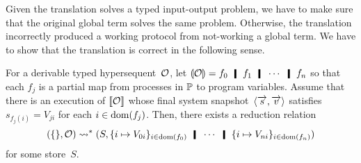  Given the translation solves a typed input-output problem, we have to
 make sure that the original global term solves the same problem.
 Otherwise, the translation incorrectly produced a working protocol from
 not-working a global term.
 We have to show that the translation is correct in the following sense.
  \begin{proposition}
   \label{general-sound}
   For a derivable typed hypersequent~$\mathcal{O}$, let $\semoi{\hypert} =
   f_0\hmid
   f_1\hmid\cdots \hmid f_n$ so that each $f_j$ is a partial map
   from processes in $\mathbb{P}$ to program variables.
   Assume that there is an execution of $\llbracket{\mathcal{O}}\rrbracket$ whose
   final system snapshot~$\langle{\overrightarrow s,\overrightarrow v}\rangle$ satisfies
   $s_{f_j(i)} = V_{ji}$ for each $i \in \mathop{\mathrm{dom}}(f_j)$.
   Then, there exists a reduction relation
   \[
   \concreteconf{\{\}}{\hypert}\reduction
   \concreteconf{S}{
   \{i\mapsto V_{0i}\}_{i\in\dom(f_0)}\hmid
   \cdots\hmid
   \{i\mapsto V_{ni}\}_{i\in\dom(f_n)}
   }
   \]
   for some store~$S$.
  \end{proposition}
